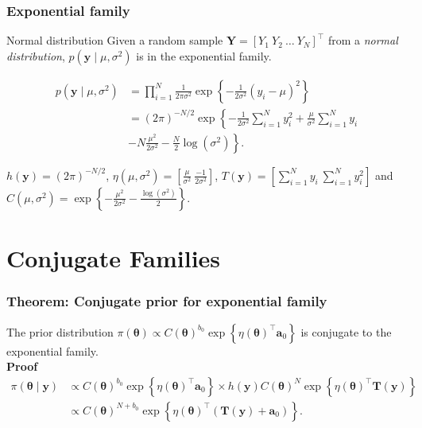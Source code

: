 \documentclass[12pt, compress]{beamer}
\begin{document}
\begin{frame}
	\frametitle{Exponential family}
\begin{block}{Normal distribution}
	Given a random sample $\bm{Y}=[Y_1 \ Y_2 \ \dots \ Y_N]^{\top}$ from a \textit{normal distribution}, $p(\bm{y}\mid \mu,\sigma^2)$ is in the exponential family.
	{\small{
	\begin{align}
		p(\bm{y}\mid \mu,\sigma^2)&=\prod_{i=1}^N \frac{1}{2\pi\sigma^2}\exp\left\{-\frac{1}{2\sigma^2}\left(y_i-\mu\right)^2\right\}\nonumber\\
		&= (2\pi)^{-N/2}\exp\left\{-\frac{1}{2\sigma^2}\sum_{i=1}^Ny_i^2+\frac{\mu}{\sigma^2}\sum_{i=1}^N y_i\right.\nonumber\\
		&-\left.N\frac{\mu^2}{2\sigma^2}-\frac{N}{2}\log(\sigma^2)\right\}\nonumber.
	\end{align}
	
	$h(\bm{y})=(2\pi)^{-N/2}$, $\eta(\mu,\sigma^2)=\left[\frac{\mu}{\sigma^2} \ \frac{-1}{2\sigma^2}\right]$, $T(\bm{y})=\left[\sum_{i=1}^N y_i \ \sum_{i=1}^N y_i^2\right]$ and $C(\mu,\sigma^2)=\exp\left\{-\frac{\mu^2}{2\sigma^2}-\frac{\log(\sigma^2)}{2}\right\}$.}}
\end{block}
\end{frame}

\section{Conjugate Families}


\begin{frame}
	\frametitle{Theorem: Conjugate prior for exponential family}
The prior distribution $\pi(\bm{\theta})\propto C(\bm{\theta})^{b_0}\exp\left\{\eta(\bm{\theta})^{\top}\bm{a}_0\right\}$ is conjugate to the exponential family.\\

\textbf{Proof}
\begin{align}
	\pi(\bm{\theta}\mid \bm{y})& \propto C(\bm{\theta})^{b_0}\exp\left\{\eta(\bm{\theta})^{\top}\bm{a}_0\right\} \times h(\bm{y}) C(\bm{\theta})^N\exp\left\{\eta(\bm{\theta})^{\top}\bm{T}(\bm{y})\right\}\nonumber\\
	& \propto C(\bm{\theta})^{N+b_0} \exp\left\{\eta(\bm{\theta})^{\top}(\bm{T}(\bm{y})+\bm{a}_0)\right\}.\nonumber 
\end{align}
\end{frame}
\end{document}
